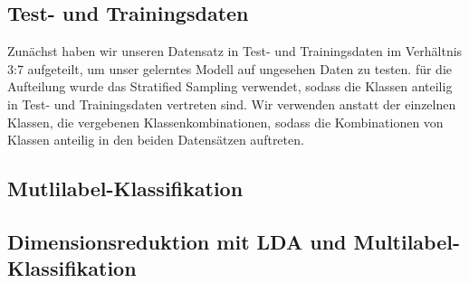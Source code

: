 \subsection{Test- und Trainingsdaten}
\label{sub:test_und_trainingsdaten}
Zunächst haben wir unseren Datensatz in Test- und Trainingsdaten im Verhältnis 3:7 aufgeteilt, um unser gelerntes Modell auf ungesehen Daten zu testen. für die Aufteilung wurde das Stratified Sampling verwendet, sodass die Klassen anteilig in Test- und Trainingsdaten vertreten sind. Wir verwenden anstatt der einzelnen Klassen, die vergebenen Klassenkombinationen, sodass die Kombinationen von Klassen anteilig in den beiden Datensätzen auftreten.

\subsection{Mutlilabel-Klassifikation}

\subsection{Dimensionsreduktion mit LDA und Multilabel-Klassifikation}

